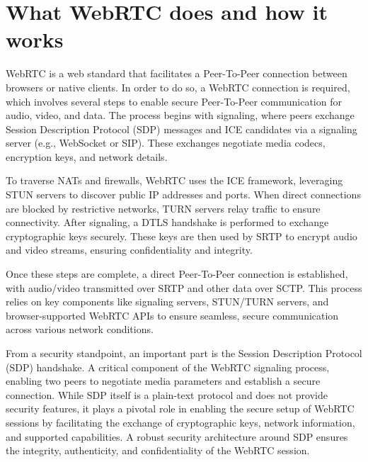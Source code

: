 \documentclass[conference]{IEEEtran}
\begin{document}
\section{What WebRTC does and how it works}
WebRTC is a web standard that facilitates a Peer-To-Peer connection between browsers or native clients. In order to do so, a WebRTC connection 
is required, which involves several steps to enable secure Peer-To-Peer communication for audio, video, and data. 
The process begins with signaling, where peers exchange Session Description Protocol (SDP) messages and ICE candidates via a 
signaling server (e.g., WebSocket or SIP). These exchanges negotiate media codecs, encryption keys, and network details. \cite{W3C_WebRTC}

To traverse NATs and firewalls, WebRTC uses the ICE framework, leveraging STUN servers to discover public IP addresses and ports. 
When direct connections are blocked by restrictive networks, TURN servers relay traffic to ensure connectivity. After signaling, a
DTLS handshake is performed to exchange cryptographic keys securely. These keys are then used by SRTP to encrypt audio and video streams, 
ensuring confidentiality and integrity. \cite{W3C_WebRTC}

Once these steps are complete, a direct Peer-To-Peer connection is established, with audio/video transmitted over SRTP 
and other data over SCTP. This process relies on key components like signaling servers, STUN/TURN servers, and browser-supported 
WebRTC APIs to ensure seamless, secure communication across various network conditions. \cite{W3C_WebRTC}

From a security standpoint, an important part is the Session Description Protocol (SDP) handshake. A critical component of the WebRTC signaling process, 
enabling two peers to negotiate media parameters and establish a secure connection.\cite{RFC8827} While SDP itself is a plain-text protocol 
and does not provide security features, it plays a pivotal role in enabling the secure setup of WebRTC sessions by facilitating the exchange 
of cryptographic keys, network information, and supported capabilities. A robust security architecture around SDP ensures the integrity, 
authenticity, and confidentiality of the WebRTC session.
\end{document}
